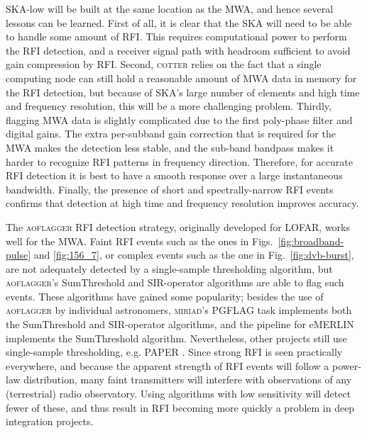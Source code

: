\documentclass{pasa}
\begin{document}
SKA-low will be built at the same location as the MWA, and hence several lessons can be learned. First of all, it is clear that the SKA will need to be able to handle some amount of RFI. This requires computational power to perform the RFI detection, and a receiver signal path with headroom sufficient to avoid gain compression by RFI. Second, \textsc{cotter} relies on the fact that a single computing node can still hold a reasonable amount of MWA data in memory for the RFI detection, but because of SKA's large number of elements and high time and frequency resolution, this will be a more challenging problem. Thirdly, flagging MWA data is slightly complicated due to the first poly-phase filter and digital gains. The extra per-subband gain correction that is required for the MWA makes the detection less stable, and the sub-band bandpass makes it harder to recognize RFI patterns in frequency direction. Therefore, for accurate RFI detection it is best to have a smooth response over a large instantaneous bandwidth. Finally, the presence of short and spectrally-narrow RFI events confirms that detection at high time and frequency resolution improves accuracy.

The \textsc{aoflagger} RFI detection strategy, originally developed for LOFAR, works well for the MWA. Faint RFI events such as the ones in Figs.~\ref{fig:broadband-pulse} and \ref{fig:156_7}, or complex events such as the one in Fig.~\ref{fig:dvb-burst}, are not adequately detected by a single-sample thresholding algorithm, but \textsc{aoflagger}'s SumThreshold and SIR-operator algorithms are able to flag such events. These algorithms have gained some popularity; besides the use of \textsc{aoflagger} by individual astronomers, \textsc{miriad}'s PGFLAG task implements both the SumThreshold and SIR-operator algorithms, and the pipeline for eMERLIN \citep{serpent-peck-2013} implements the SumThreshold algorithm. Nevertheless, other projects still use single-sample thresholding, e.g. PAPER \citep{parsons-paper-eorlimit-2014}. Since strong RFI is seen practically everywhere, and because the apparent strength of RFI events will follow a power-law distribution, many faint transmitters will interfere with observations of any (terrestrial) radio observatory. Using algorithms with low sensitivity will detect fewer of these, and thus result in RFI becoming more quickly a problem in deep integration projects.
\end{document}
